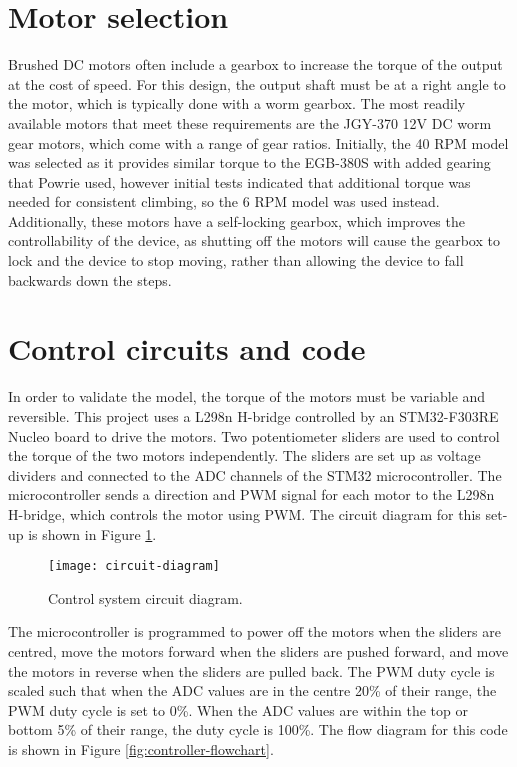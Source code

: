 \section{Motor selection}
Brushed DC motors often include a gearbox to increase the torque of the output at the cost of speed. For this design, the output shaft must be at a right angle to the motor, which is typically done with a worm gearbox. The most readily available motors that meet these requirements are the JGY-370 12V DC worm gear motors, which come with a range of gear ratios. Initially, the 40 RPM model was selected as it provides similar torque to the EGB-380S with added gearing that Powrie used, however initial tests indicated that additional torque was needed for consistent climbing, so the 6 RPM model was used instead.\\
Additionally, these motors have a self-locking gearbox, which improves the controllability of the device, as shutting off the motors will cause the gearbox to lock and the device to stop moving, rather than allowing the device to fall backwards down the steps.

\section{Control circuits and code}
In order to validate the model, the torque of the motors must be variable and reversible. This project uses a L298n H-bridge controlled by an STM32-F303RE Nucleo board to drive the motors. Two potentiometer sliders are used to control the torque of the two motors independently. The sliders are set up as voltage dividers and connected to the ADC channels of the STM32 microcontroller. The microcontroller sends a direction and PWM signal for each motor to the L298n H-bridge, which controls the motor using PWM. The circuit diagram for this set-up is shown in Figure \ref{fig:circuit-diagram}.

\begin{figure}[!h]
	\centering
	\texttt{[image: circuit-diagram]}
	\caption{Control system circuit diagram.}
	\label{fig:circuit-diagram}
\end{figure}

The microcontroller is programmed to power off the motors when the sliders are centred, move the motors forward when the sliders are pushed forward, and move the motors in reverse when the sliders are pulled back. The PWM duty cycle is scaled such that when the ADC values are in the centre 20\% of their range, the PWM duty cycle is set to 0\%. When the ADC values are within the top or bottom 5\% of their range, the duty cycle is 100\%. The flow diagram for this code is shown in Figure \ref{fig:controller-flowchart}.


